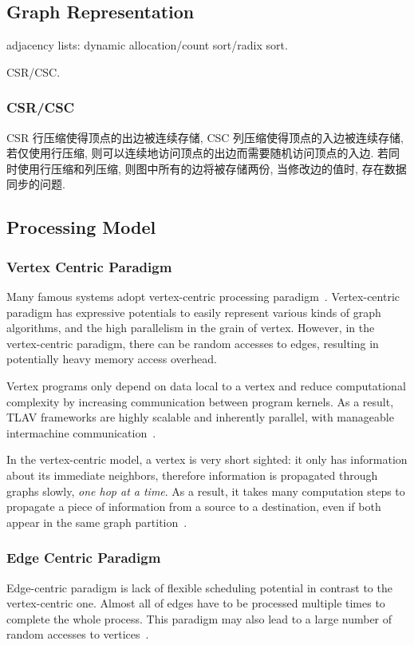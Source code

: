\documentclass[UTF8,12pt,a4paper]{article}
\begin{document}
\subsection{Graph Representation}
\begin{compactitem}
  \item adjacency lists: dynamic allocation/count sort/radix sort.
  \item CSR/CSC.
\end{compactitem}
\subsubsection{CSR/CSC}
CSR 行压缩使得顶点的出边被连续存储, CSC 列压缩使得顶点的入边被连续存储,
若仅使用行压缩, 则可以连续地访问顶点的出边而需要随机访问顶点的入边.
若同时使用行压缩和列压缩, 则图中所有的边将被存储两份,
当修改边的值时, 存在数据同步的问题.

\subsection{Processing Model}
\subsubsection{Vertex Centric Paradigm}
Many famous systems adopt
vertex-centric processing paradigm~\cite{DBLP:journals/csur/McCuneWM15}.
Vertex-centric paradigm has expressive potentials
to easily represent various kinds of graph algorithms,
and the high parallelism in the grain of vertex.
However, in the vertex-centric paradigm,
there can be random accesses to edges,
resulting in potentially heavy memory access overhead.

Vertex programs only depend on data local to a vertex
and reduce computational complexity by increasing communication between program kernels.
As a result, TLAV frameworks are highly scalable and inherently parallel,
with manageable intermachine communication~\cite{DBLP:journals/csur/McCuneWM15}.

In the vertex-centric model, a vertex is very short sighted:
it only has information about its immediate neighbors,
therefore information is propagated through graphs slowly,
\textit{one hop at a time}.
As a result, it takes many computation steps
to propagate a piece of information from a source to a destination,
even if both appear in the same graph partition~\cite{DBLP:journals/csur/HeidariSCB18}.
\subsubsection{Edge Centric Paradigm}
Edge-centric paradigm is lack of flexible scheduling potential
in contrast to the vertex-centric one.
Almost all of edges have to be processed multiple times
to complete the whole process.
This paradigm may also lead to
a large number of random accesses to vertices~\cite{DBLP:conf/usenix/MalicevicLZ17}.
\end{document}
